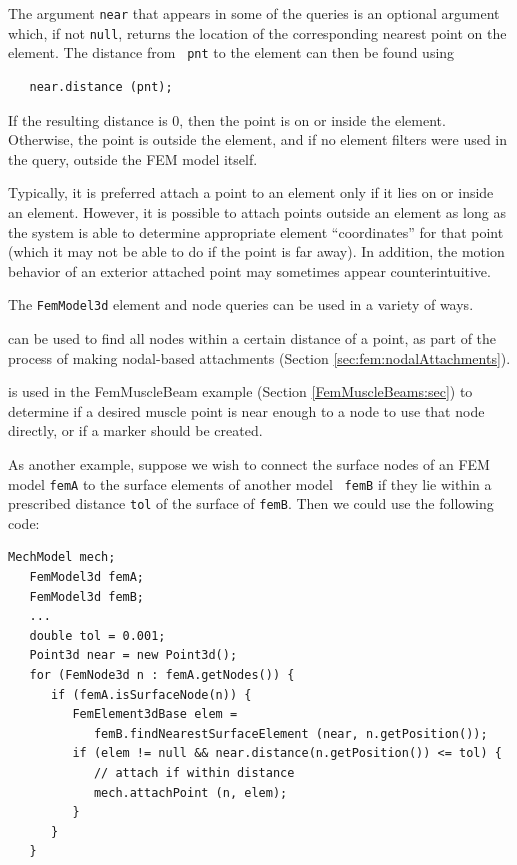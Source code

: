 The argument {\tt near} that appears in some of the queries is an
optional argument which, if not {\tt null}, returns the location of
the corresponding nearest point on the element. The distance from {\tt
pnt} to the element can then be found using
%
\begin{verbatim}
   near.distance (pnt);
\end{verbatim}
%
If the resulting distance is 0, then the point is on or inside the
element. Otherwise, the point is outside the element, and if no
element filters were used in the query, outside the FEM model itself.

\begin{sideblock}
Typically, it is preferred attach a point to an element only if it
lies on or inside an element. However, it is possible to attach points
outside an element as long as the system is able to determine
appropriate element ``coordinates'' for that point (which it may not
be able to do if the point is far away). In addition, the motion
behavior of an exterior attached point may sometimes appear
counterintuitive.
\end{sideblock}

The {\tt FemModel3d} element and node queries can be used in a variety
of ways.

can be used to find all nodes within a certain distance of a point, as
part of the process of making nodal-based attachments
(Section \ref{sec:fem:nodalAttachments}).

is used in the FemMuscleBeam example
(Section \ref{FemMuscleBeams:sec}) to determine if a desired muscle
point is near enough to a node to use that node directly, or if a
marker should be created.

As another example, suppose we wish to connect the surface nodes of an
FEM model {\tt femA} to the surface elements of another model {\tt
femB} if they lie within a prescribed distance {\tt tol} of the
surface of {\tt femB}. Then we could use the following code:
%
\begin{lstlisting}[]
   MechModel mech;
   FemModel3d femA;
   FemModel3d femB;
   ...
   double tol = 0.001;
   Point3d near = new Point3d();
   for (FemNode3d n : femA.getNodes()) {
      if (femA.isSurfaceNode(n)) {
         FemElement3dBase elem = 
            femB.findNearestSurfaceElement (near, n.getPosition());
         if (elem != null && near.distance(n.getPosition()) <= tol) {
            // attach if within distance
            mech.attachPoint (n, elem);
         }
      }
   }
\end{lstlisting}
%

